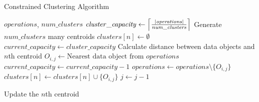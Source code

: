 \documentclass[runningheads]{llncs}
\DeclarePairedDelimiter\ceil{\lceil}{\rceil}
\begin{document}
%
%
\begin{algorithm}[t]
  \caption{Constrained Clustering Algorithm}\label{alg2}
  \begin{algorithmic}
  \Require $\mathit{operations}$, $\mathit{num\_clusters}$
  \State $\mathit{cluster\_capacity} \gets \ceil*{\frac{|\mathit{operations}|}{\mathit{num\_clusters}}}$
  \State Generate $\mathit{num\_clusters}$ many centroids
      \State $\mathit{clusters}[n] \gets \emptyset$
      \State $\mathit{current\_capacity} \gets \mathit{cluster\_capacity}$
            \State Calculate distance between data objects and $n$th centroid   
            \State $O_{i,j} \gets \text{Nearest data object from }\mathit{operations}$ %
            \Repeat
            \State $\mathit{current\_capacity} \gets \mathit{current\_capacity} - 1$
            \State $\mathit{operations} \gets \mathit{operations} \setminus \{O_{i,j}\}$
            \State $\mathit{clusters}[n] \gets \mathit{clusters}[n] \cup \{O_{i,j}\}$ 
            \State $j \gets j-1$
             
  
            \State Update the $n$th centroid %
    \EndWhile
  \EndFor
  \end{algorithmic}
  \end{algorithm}
\end{document}

